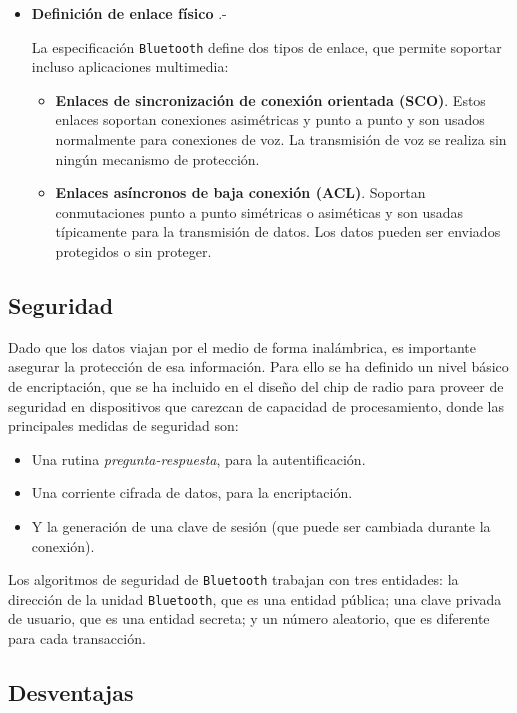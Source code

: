 \begin{itemize}
\item \textbf{Definición de enlace físico} .-

La especificación \texttt{Bluetooth} define dos tipos de enlace, que permite
soportar incluso aplicaciones multimedia:
\begin{itemize}
\item \textbf{Enlaces de sincronización de conexión orientada (SCO)}. Estos
enlaces soportan conexiones asimétricas y punto a punto y son usados
normalmente para conexiones de voz. La transmisión de voz se realiza sin
ningún mecanismo de protección.
\item \textbf{Enlaces asíncronos de baja conexión (ACL)}. Soportan
conmutaciones punto a punto simétricas o asiméticas y son usadas típicamente
para la transmisión de datos. Los datos pueden ser enviados protegidos o
sin proteger.
\end{itemize}
\end{itemize}

  \subsection{Seguridad}

Dado que los datos viajan por el medio de forma inalámbrica, es importante
asegurar la protección de esa información. Para ello se ha definido un nivel
básico de encriptación, que se ha incluido en el diseño del chip de radio
para proveer de seguridad en dispositivos que carezcan de capacidad de 
procesamiento, donde las principales medidas de seguridad son:
\begin{itemize}
\item Una rutina \emph{pregunta-respuesta}, para la autentificación.
\item Una corriente cifrada de datos, para la encriptación.
\item Y la generación de una clave de sesión (que puede ser cambiada durante
la conexión).
\end{itemize}
Los algoritmos de seguridad de \texttt{Bluetooth} trabajan con tres entidades:
la dirección de la unidad \texttt{Bluetooth}, que es una entidad pública; una
clave privada de usuario, que es una entidad secreta; y un número aleatorio,
que es diferente para cada transacción.

  \subsection{Desventajas}
  \label{subsec:disadvantages}

